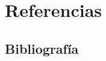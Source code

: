 \documentclass[11pt, a4paper, titlepage]{article}
\begin{document}


\clearpage

\newpage
\section{Referencias}
\subsection{Bibliografía}
\printbibliography
\end{document}
